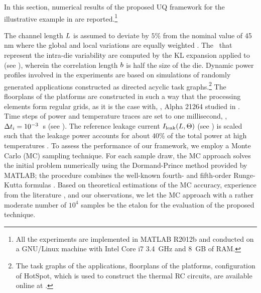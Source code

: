 In this section, numerical results of the proposed UQ framework for the illustrative example in  are reported.\footnote{All the experiments are implemented in MATLAB R2012b \cite{matlab} and conducted on a GNU/Linux machine with Intel Core i7 3.4~GHz and 8~GB of RAM.}

The channel length $L$ is assumed to deviate by $5\%$ from the nominal value of 45 nm where the global and local variations are equally weighted \cite{juan2011, juan2012}. The \rvs\ that represent the intra-die variability are computed by the KL expansion applied to  (see ), wherein the correlation length $b$ is half the size of the die. Dynamic power profiles involved in the experiments are based on simulations of randomly generated applications constructed as directed acyclic task graphs.\footnote{The task graphs of the applications, floorplans of the platforms, configuration of HotSpot, which is used to construct the thermal RC circuits, are available online at \cite{sources}.} The floorplans of the platforms are constructed in such a way that the processing elements form regular grids, as it is the case with, \eg, Alpha 21264 studied in \cite{juan2011}. Time steps of power and temperature traces are set to one millisecond, \ie, $\Delta t_i = 10^{-3}$~s (see ). The reference leakage current $I_{\text{leak}}(L, \Theta)$ (see ) is scaled such that the leakage power accounts for about $40\%$ of the total power at high temperatures \cite{liu2007}. To assess the performance of our framework, we employ a Monte Carlo (MC) sampling technique. For each sample draw, the MC approach solves the initial problem numerically using the Dormand-Prince method provided by MATLAB; the procedure combines the well-known fourth- and fifth-order Runge-Kutta formulas \cite{press2007}. Based on theoretical estimations \cite{diaz-emparanza2002} of the MC accuracy, experience from the literature \cite{xiu2010, eldred2009, maitre2010, shen2009}, and our observations, we let the MC approach with a rather moderate number of $10^4$ samples be the etalon for the evaluation of the proposed technique.

